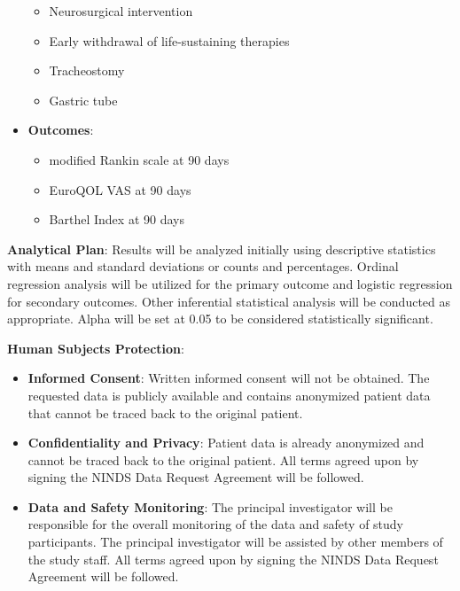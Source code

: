 \documentclass[
  letterpaper,
  DIV=11,
  numbers=noendperiod]{scrartcl}
\providecommand{\tightlist}{%
  \setlength{\itemsep}{0pt}\setlength{\parskip}{0pt}}\usepackage{longtable,booktabs,array}
\begin{document}
\begin{itemize}
  \begin{itemize}
  \tightlist
  \item
    Neurosurgical intervention
  \item
    Early withdrawal of life-sustaining therapies
  \item
    Tracheostomy
  \item
    Gastric tube
  \end{itemize}
\item
  \textbf{Outcomes}:

  \begin{itemize}
  \tightlist
  \item
    modified Rankin scale at 90 days
  \item
    EuroQOL VAS at 90 days
  \item
    Barthel Index at 90 days
  \end{itemize}
\end{itemize}

\textbf{Analytical Plan}: Results will be analyzed initially using
descriptive statistics with means and standard deviations or counts and
percentages. Ordinal regression analysis will be utilized for the
primary outcome and logistic regression for secondary outcomes. Other
inferential statistical analysis will be conducted as appropriate. Alpha
will be set at 0.05 to be considered statistically significant.

\textbf{Human Subjects Protection}:

\begin{itemize}
\item
  \textbf{Informed Consent}: Written informed consent will not be
  obtained. The requested data is publicly available and contains
  anonymized patient data that cannot be traced back to the original
  patient.
\item
  \textbf{Confidentiality and Privacy}: Patient data is already
  anonymized and cannot be traced back to the original patient. All
  terms agreed upon by signing the NINDS Data Request Agreement will be
  followed.
\item
  \textbf{Data and Safety Monitoring}: The principal investigator will
  be responsible for the overall monitoring of the data and safety of
  study participants. The principal investigator will be assisted by
  other members of the study staff. All terms agreed upon by signing the
  NINDS Data Request Agreement will be followed.
\end{itemize}
\end{document}
